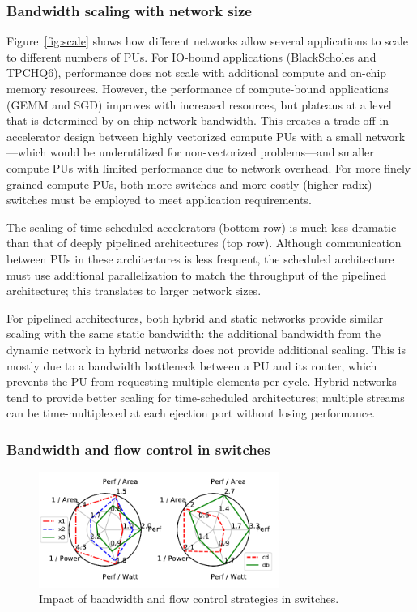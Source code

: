 \subsubsection{Bandwidth scaling with network size}\label{sec:scale}
Figure~\ref{fig:scale} shows how different networks allow several applications to scale to different numbers of PUs.
For IO-bound applications (BlackScholes and TPCHQ6), performance does not scale with additional compute and on-chip memory resources.
However, the performance of compute-bound applications (GEMM and SGD) improves with increased resources, but plateaus at a level that is determined by on-chip network bandwidth. 
This creates a trade-off in accelerator design between highly vectorized compute PUs with a small network---which would be underutilized for non-vectorized problems---and smaller compute PUs with limited performance due to network overhead. 
For more finely grained compute PUs, both more switches and more costly (higher-radix) switches must be employed to meet application requirements.

The scaling of time-scheduled accelerators (bottom row) is much less dramatic than that of deeply pipelined architectures (top row). 
Although communication between PUs in these architectures is less frequent, the scheduled architecture must use additional parallelization to match the throughput of the pipelined architecture; this translates to larger network sizes. 

For pipelined architectures, both hybrid and static networks provide similar scaling with the same static bandwidth:
the additional bandwidth from the dynamic network in hybrid networks does not provide additional scaling. 
This is mostly due to a bandwidth bottleneck between a PU and its router, which prevents the PU from requesting multiple elements per cycle.
Hybrid networks tend to provide better scaling for time-scheduled architectures; multiple streams can be time-multiplexed at each ejection port without losing performance.

\subsubsection{Bandwidth and flow control in switches}

\begin{figure}
  \centering
\includegraphics[width=0.7\textwidth]{network/figs/radar_switch.pdf}
  \caption{
    Impact of bandwidth and flow control strategies in switches.}\label{fig:radar_switch}
\end{figure}


